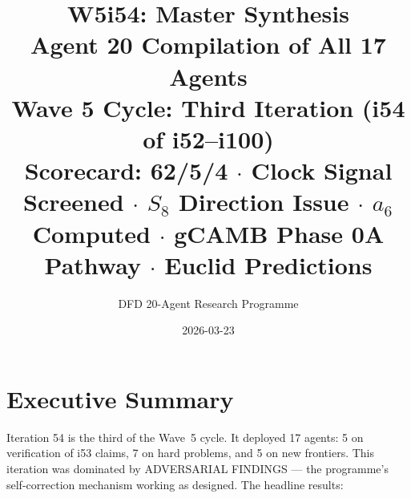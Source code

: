 \documentclass[11pt,a4paper]{article}
\title{\Huge W5i54: Master Synthesis\\[12pt]
\Large Agent 20 Compilation of All 17 Agents\\[6pt]
\large Wave 5 Cycle: Third Iteration (i54 of i52--i100)\\[6pt]
\normalsize Scorecard: 62/5/4 $\cdot$ Clock Signal Screened $\cdot$ $S_8$ Direction Issue $\cdot$ $a_6$ Computed $\cdot$ gCAMB Phase 0A Pathway $\cdot$ Euclid Predictions}
\author{DFD 20-Agent Research Programme}
\date{2026-03-23}
\begin{document}
\maketitle


\section{Executive Summary}

Iteration 54 is the third of the Wave~5 cycle. It deployed 17 agents: 5 on verification of i53 claims, 7 on hard problems, and 5 on new frontiers. This iteration was dominated by ADVERSARIAL FINDINGS --- the programme's self-correction mechanism working as designed. The headline results:
\end{document}
